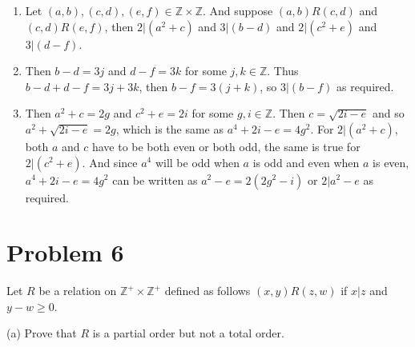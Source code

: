\documentclass{article}
\begin{document}
    \begin{enumerate}[label=\quad\quad, leftmargin=*]
        \item 
        Let $(a,b),(c,d),(e,f)\in \mathbb{Z}\times \mathbb{Z}$. And suppose $(a,b)R(c,d)$ and $(c,d)R(e,f)$,
        then $2|(a^2+c)$ and $3|(b-d)$ and $2|(c^2+e)$ and $3|(d-f)$.
        \item
        Then $b-d=3j$ and $d-f=3k$ for some $j,k\in \mathbb{Z}$. Thus $b-d+d-f=3j+3k$, then
        $b-f=3(j+k)$, so $3|(b-f)$ as required.
        \item
        Then $a^2+c=2g$ and $c^2+e=2i$ for some $g,i\in \mathbb{Z}$. 
        Then $c=\sqrt{2i-e}$ and so $a^2+\sqrt{2i-e}=2g$, which is the same as 
        $a^4+2i-e=4g^2$.
        For $2|(a^2+c)$, both 
        $a$ and $c$ have to be both even or both odd, the same is true for $2|(c^2+e)$. 
        And since $a^4$ will be odd when $a$ is odd and even when $a$ is even, 
        $a^4+2i-e=4g^2$ can be written as $a^2-e=2(2g^2-i)$ or $2|a^2-e$ as required.
    \end{enumerate}


    \section*{Problem 6}

    Let $R$ be a relation on $\mathbb{Z}^+\times \mathbb{Z}^+$ defined as follows $(x,y)R(z,w)$ if $x|z$
    and $y-w\geq 0$.

    (a) Prove that $R$ is a partial order but not a total order.
\end{document}
